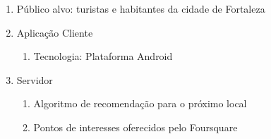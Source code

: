 \documentclass[10pt,a4paper,twocolumn]{article}
\begin{document}
\begin{enumerate}
\item Público alvo: turistas e habitantes da cidade de Fortaleza
\item Aplicação Cliente
\begin{enumerate}
\item Tecnologia: Plataforma Android \cite{Android}
\end{enumerate}
\item Servidor
\begin{enumerate}
\item Algoritmo de recomendação para o próximo local
\item Pontos de interesses oferecidos pelo Foursquare \cite{Foursquare}
\end{enumerate}

\end{enumerate}






\end{document}

